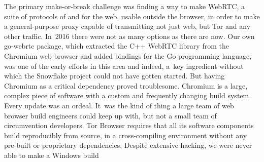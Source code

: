 \documentclass[letterpaper,twocolumn]{article}
\begin{document}
The primary make-or-break challenge was finding a way to make
WebRTC, a suite of protocols of and for the web,
usable outside the browser,
in order to make a general-purpose proxy capable of transmitting
not just web, but Tor and any other traffic.
In~2016 there were not as many options as there are now.
Our own \mbox{go-webrtc} package,
which extracted the C++ WebRTC library
from the Chromium web browser and added bindings
for the Go programming language,
was one of the early efforts in this area and indeed,
a~key ingredient without which
the Snowflake project could not have gotten started.
But having Chromium as a critical dependency proved troublesome.
Chromium is a large, complex piece of software
with a custom and frequently changing build system.
Every update was an ordeal.
It~was the kind of thing
a large team of web browser build engineers could keep up with,
but not a small team of circumvention developers.
Tor Browser requires that all its software components
build reproducibly from source,
in a cross-compiling environment without any
pre-built or proprietary dependencies.
Despite extensive hacking,
we were never able to make a Windows build
\end{document}
